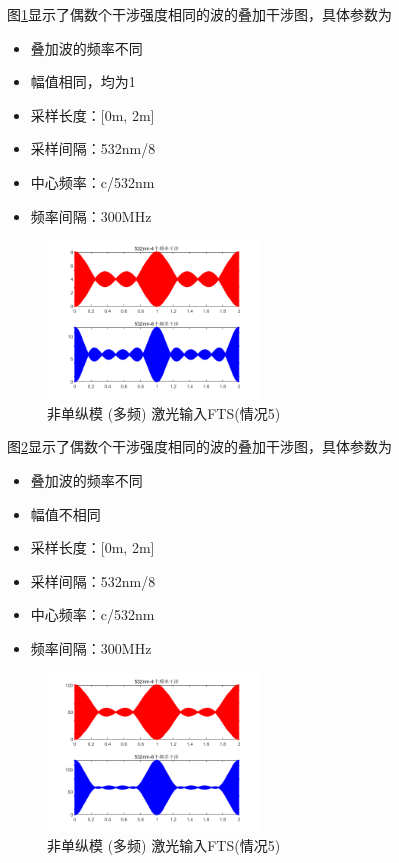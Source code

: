 \documentclass[conference]{IEEEtran}
\begin{document}
图\ref{pic8}显示了偶数个干涉强度相同的波的叠加干涉图，具体参数为
\begin{itemize}
    \item 叠加波的频率不同
    \item 幅值相同，均为1
    \item 采样长度：[0m, 2m]
    \item 采样间隔：532nm/8
    \item 中心频率：c/532nm
    \item 频率间隔：300MHz
\end{itemize}
\begin{figure}[htbp]
    \centerline{\includegraphics[width=0.5\textwidth]{pic8.png}}
    \caption{非单纵模 (多频) 激光输入FTS(情况5)}
    \label{pic8}
\end{figure}
图\ref{pic9}显示了偶数个干涉强度相同的波的叠加干涉图，具体参数为
\begin{itemize}
    \item 叠加波的频率不同
    \item 幅值不相同
    \item 采样长度：[0m, 2m]
    \item 采样间隔：532nm/8
    \item 中心频率：c/532nm
    \item 频率间隔：300MHz
\end{itemize}
\begin{figure}[htbp]
    \centerline{\includegraphics[width=0.5\textwidth]{pic9.png}}
    \caption{非单纵模 (多频) 激光输入FTS(情况5)}
    \label{pic9}
\end{figure}
\end{document}
